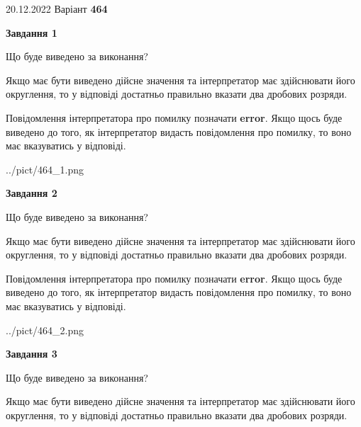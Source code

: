 \documentclass[12pt, ukrainian]{article}
\begin{document}
{20.12.2022 Варіант \No \textbf { 464 }\par}
{
\begin {Large}

{\begin {center}\textbf{Завдання 1}\end {center}}\par
Що буде виведено за виконання? \par

Якщо має бути виведено дійсне значення та інтерпретатор має здійснювати його округлення, 
то у відповіді достатньо правильно вказати два дробових розряди.

Повідомлення інтерпретатора про помилку позначати \textbf{error}.
Якщо щось буде виведено до того, як інтерпретатор видасть повідомлення про помилку, 
то воно має вказуватись у відповіді. \par

\begin{center}
	{../pict/464_1.png}
\end{center}
\newpage

{\begin {center}\textbf{Завдання 2}\end {center}}\par
Що буде виведено за виконання? \par

Якщо має бути виведено дійсне значення та інтерпретатор має здійснювати його округлення, 
то у відповіді достатньо правильно вказати два дробових розряди.

Повідомлення інтерпретатора про помилку позначати \textbf{error}.
Якщо щось буде виведено до того, як інтерпретатор видасть повідомлення про помилку, 
то воно має вказуватись у відповіді. \par

\begin{center}
	{../pict/464_2.png}
\end{center}
\newpage

{\begin {center}\textbf{Завдання 3}\end {center}}\par
Що буде виведено за виконання? \par

Якщо має бути виведено дійсне значення та інтерпретатор має здійснювати його округлення, 
то у відповіді достатньо правильно вказати два дробових розряди.


\end{Large}}
\end{document}
